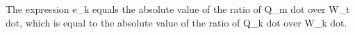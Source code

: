 The expression e_k equals the absolute value of the ratio of Q_m dot over W_t dot, which is equal to the absolute value of the ratio of Q_k dot over W_k dot.